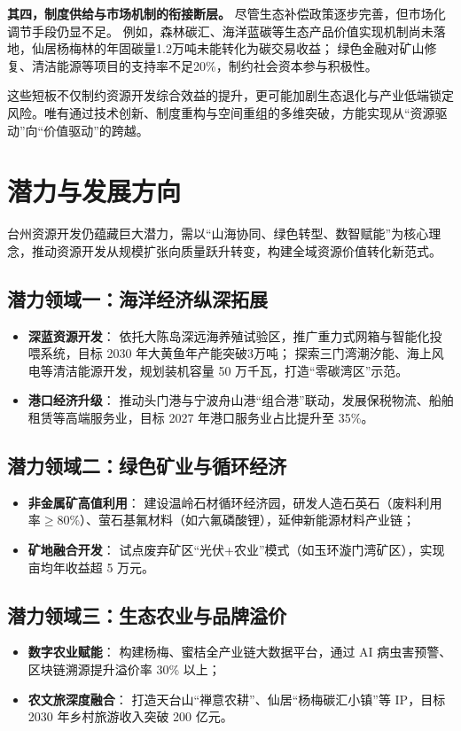 \documentclass[11pt]{article}
\begin{document}
\textbf{其四，制度供给与市场机制的衔接断层。}
尽管生态补偿政策逐步完善，但市场化调节手段仍显不足。
例如，森林碳汇、海洋蓝碳等生态产品价值实现机制尚未落地，仙居杨梅林的年固碳量1.2万吨未能转化为碳交易收益；
绿色金融对矿山修复、清洁能源等项目的支持率不足20\%，制约社会资本参与积极性。

这些短板不仅制约资源开发综合效益的提升，更可能加剧生态退化与产业低端锁定风险。唯有通过技术创新、制度重构与空间重组的多维突破，方能实现从“资源驱动”向“价值驱动”的跨越。

\section{潜力与发展方向}\label{sec:future}

台州资源开发仍蕴藏巨大潜力，需以“山海协同、绿色转型、数智赋能”为核心理念，推动资源开发从规模扩张向质量跃升转变，构建全域资源价值转化新范式。

\subsection{潜力领域一：海洋经济纵深拓展}\label{subsec:marine-economy}
\begin{itemize}
  \item \textbf{深蓝资源开发}：
    依托大陈岛深远海养殖试验区，推广重力式网箱与智能化投喂系统，目标 2030 年大黄鱼年产能突破3万吨；
    探索三门湾潮汐能、海上风电等清洁能源开发，规划装机容量 50 万千瓦，打造“零碳湾区”示范。
  \item \textbf{港口经济升级}：
    推动头门港与宁波舟山港“组合港”联动，发展保税物流、船舶租赁等高端服务业，目标 2027 年港口服务业占比提升至 35\%。
\end{itemize}

\subsection{潜力领域二：绿色矿业与循环经济}\label{subsec:green-mining}
\begin{itemize}
  \item \textbf{非金属矿高值利用}：
    建设温岭石材循环经济园，研发人造石英石（废料利用率$\geq$80\%）、萤石基氟材料（如六氟磷酸锂），延伸新能源材料产业链；
  \item \textbf{矿地融合开发}：
    试点废弃矿区“光伏+农业”模式（如玉环漩门湾矿区），实现亩均年收益超 5 万元。
\end{itemize}

\subsection{潜力领域三：生态农业与品牌溢价}\label{subsec:ecological-agriculture}
\begin{itemize}
  \item \textbf{数字农业赋能}：
    构建杨梅、蜜桔全产业链大数据平台，通过 AI 病虫害预警、区块链溯源提升溢价率 30\% 以上；
  \item \textbf{农文旅深度融合}：
    打造天台山“禅意农耕”、仙居“杨梅碳汇小镇”等 IP，目标 2030 年乡村旅游收入突破 200 亿元。
\end{itemize}
\end{document}

